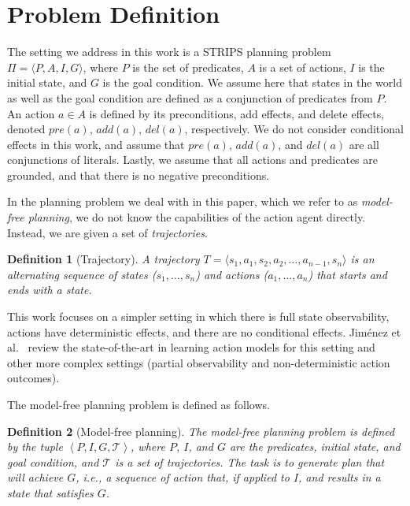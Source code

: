 \documentclass[letterpaper]{article}
\newtheorem{definition}{Definition}
\newcommand{\tuple}[1]{\ensuremath{\left \langle #1 \right \rangle }}
\begin{document}
\section{Problem Definition}
The setting we address in this work is a STRIPS planning problem $\Pi=\langle P, A, I, G\rangle$, where $P$ is the set of predicates, $A$ is a set of actions, $I$ is the initial state, and $G$ is the goal condition. We assume here that states in the world as well as the goal condition are defined as a conjunction of predicates from $P$. An action $a\in A$ is defined by its preconditions, add effects, and delete effects, denoted $pre(a)$, $add(a)$, $del(a)$, respectively. 
We do not consider conditional effects in this work, and assume that 
$pre(a)$, $add(a)$, and $del(a)$ are all conjunctions of literals. Lastly, we assume that all actions and predicates are grounded, and that there is no negative preconditions.  


In the planning problem we deal with in this paper, which we refer to as {\em model-free planning}, we do not know the capabilities of the action agent directly. Instead, we are given a set of {\em trajectories}. 
\begin{definition}[Trajectory]
A trajectory $T=\langle s_1, a_1, s_2, a_2, \ldots, a_{n-1}, s_n\rangle$ is an alternating sequence of states ($s_1,\ldots,s_n$) and actions ($a_1,\ldots,a_n$) that starts and ends with a state. 
\end{definition}
This work focuses on a simpler setting in which there is full state observability, actions have deterministic effects, and there are no conditional effects. Jim{\'e}nez et al.~ review the state-of-the-art in learning action models for this setting and other more complex settings (partial observability and non-deterministic action outcomes). 


The model-free planning problem is defined as follows.
\begin{definition}[Model-free planning]
The model-free planning problem is defined by the tuple $\tuple{P,I,G, \mathcal{T}}$, 
where $P$, $I$, and $G$ are the predicates, initial state, and goal condition, and $\mathcal{T}$ is a set of trajectories. The task is to generate plan that will achieve $G$, i.e., a sequence of action that, if applied to $I$, and results in a state that satisfies $G$.
\label{def:model-free-planning}
\end{definition}
\end{document}
